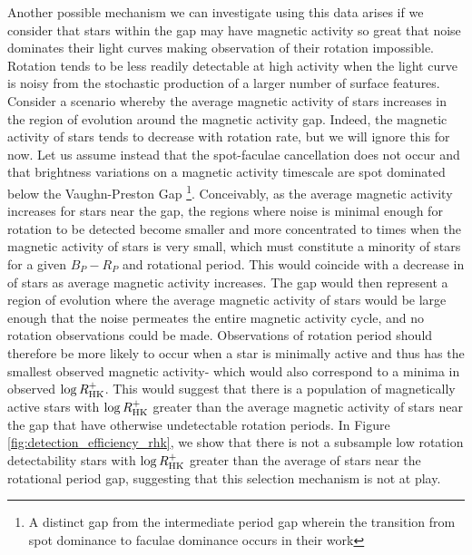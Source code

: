 Another possible mechanism we can investigate using this data arises if we consider that stars within the gap may have magnetic activity so great that noise dominates their light curves making observation of their rotation impossible.
Rotation tends to be less readily detectable at high activity when the light curve is noisy from the stochastic production of a larger number of surface features.
Consider a scenario whereby the average magnetic activity of stars increases in the region of evolution around the magnetic activity gap. 
Indeed, the magnetic activity of stars tends to decrease with rotation rate, but we will ignore this for now.
Let us assume instead that the spot-faculae cancellation does not occur and that brightness variations on a magnetic activity timescale are spot dominated below the Vaughn-Preston Gap \footnote{A distinct gap from the intermediate period gap wherein the transition from spot dominance to faculae dominance occurs in their work}.
Conceivably, as the average magnetic activity increases for stars near the gap, the regions where noise is minimal enough for rotation to be detected become smaller and more concentrated to times when the magnetic activity of stars is very small, which must constitute a minority of stars for a given $B_P-R_P$ and rotational period.
This would coincide with a decrease in \rper{} of stars as average magnetic activity increases.
The gap would then represent a region of evolution where the average magnetic activity of stars would be large enough that the noise permeates the entire magnetic activity cycle, and no rotation observations could be made.
Observations of rotation period should therefore be more likely to occur when a star is minimally active and thus has the smallest observed magnetic activity- which would also correspond to a minima in observed $\log R^{+}_{\rm{HK}}$.
This would suggest that there is a population of magnetically active stars with $\log R^{+}_{\rm{HK}}$ greater than the average magnetic activity of stars near the gap that have otherwise undetectable rotation periods.
In Figure \ref{fig:detection_efficiency_rhk}, we show that there is not a subsample low rotation detectability stars with $\log R^{+}_{\rm{HK}}$ greater than the average of stars near the rotational period gap, suggesting that this selection mechanism is not at play.

